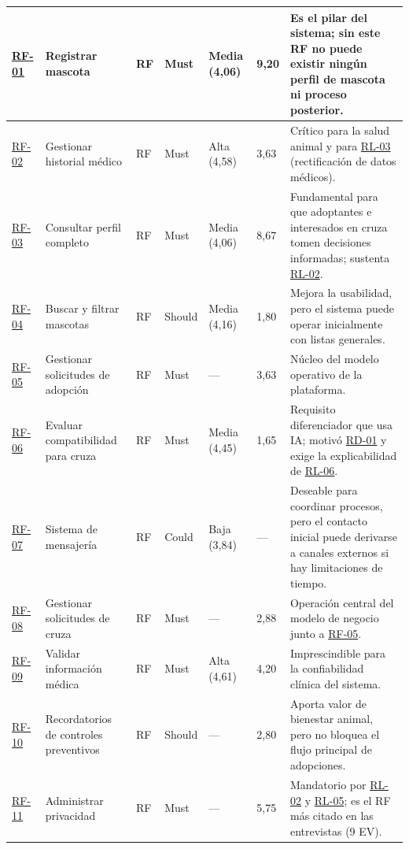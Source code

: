 \documentclass[journal,onecolumn]{IEEEtran}
\begin{document}
\begin{landscape}
\begin{longtable}{@{}p{1.2cm} p{5.2cm} p{1.0cm} p{1.3cm} p{1.3cm} p{1.1cm} p{6.5cm}@{}}
			\hyperref[tab:RF-01]{RF-01} & Registrar mascota & RF & Must & Media (4,06) & 9,20 & Es el pilar del sistema; sin este RF no puede existir ningún perfil de mascota ni proceso posterior. \\ \midrule
			\hyperref[tab:RF-02]{RF-02} & Gestionar historial médico & RF & Must & Alta (4,58) & 3,63 & Crítico para la salud animal y para \hyperref[rl:03]{RL-03} (rectificación de datos médicos). \\ \midrule
			\hyperref[tab:RF-03]{RF-03} & Consultar perfil completo & RF & Must & Media (4,06) & 8,67 & Fundamental para que adoptantes e interesados en cruza tomen decisiones informadas; sustenta \hyperref[rl:02]{RL-02}. \\ \midrule
			\hyperref[tab:RF-04]{RF-04} & Buscar y filtrar mascotas & RF & Should & Media (4,16) & 1,80 & Mejora la usabilidad, pero el sistema puede operar inicialmente con listas generales. \\ \midrule
			\hyperref[tab:RF-05]{RF-05} & Gestionar solicitudes de adopción & RF & Must & --- & 3,63 & Núcleo del modelo operativo de la plataforma. \\ \midrule
			\hyperref[tab:RF-06]{RF-06} & Evaluar compatibilidad para cruza & RF & Must & Media (4,45) & 1,65 & Requisito diferenciador que usa IA; motivó \hyperref[tab:RD-01]{RD-01} y exige la explicabilidad de \hyperref[rl:06]{RL-06}. \\ \midrule
			\hyperref[tab:RF-07]{RF-07} & Sistema de mensajería & RF & Could & Baja (3,84) & --- & Deseable para coordinar procesos, pero el contacto inicial puede derivarse a canales externos si hay limitaciones de tiempo. \\ \midrule
			\hyperref[tab:RF-08]{RF-08} & Gestionar solicitudes de cruza & RF & Must & --- & 2,88 & Operación central del modelo de negocio junto a \hyperref[tab:RF-05]{RF-05}. \\ \midrule
			\hyperref[tab:RF-09]{RF-09} & Validar información médica & RF & Must & Alta (4,61) & 4,20 & Imprescindible para la confiabilidad clínica del sistema. \\ \midrule
			\hyperref[tab:RF-10]{RF-10} & Recordatorios de controles preventivos & RF & Should & --- & 2,80 & Aporta valor de bienestar animal, pero no bloquea el flujo principal de adopciones. \\ \midrule
			\hyperref[tab:RF-11]{RF-11} & Administrar privacidad & RF & Must & --- & 5,75 & Mandatorio por \hyperref[rl:02]{RL-02} y \hyperref[rl:05]{RL-05}; es el RF más citado en las entrevistas (9 EV). \\ \midrule

\end{longtable}
\end{landscape}
\end{document}
